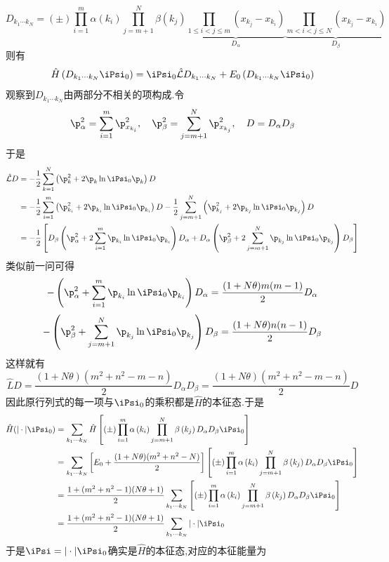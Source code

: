 \documentclass{ctexart}
\begin{document}
\begin{solution}
\begin{enumerate}[label=\tbf{(\alph*)}]
    \[D_{k_1\cdots k_N}=(\pm)\prod_{i=1}^{m}\alpha\left(k_i\right)\prod_{j=m+1}^{N}\beta\left(k_j\right)\underbrace{\prod_{1\leq i<j\leq m}\left(x_{k_j}-x_{k_i}\right)}_{D_\alpha}\underbrace{\prod_{m<i<j\leq N}\left(x_{k_j}-x_{k_i}\right)}_{D_\beta}\]
    则有
    \[\hat{H}\left(D_{k_1\cdots k_N}\iPsi_0\right)=\iPsi_0\hat{\mathcal{L}}D_{k_1\cdots k_N}+E_0\left(D_{k_1\cdots k_N}\iPsi_0\right)\]
    观察到$D_{k_1\cdots k_N}$由两部分不相关的项构成.令
    \[\p_\alpha^2=\sum_{i=1}^{m}\p^2_{x_{k_i}},\quad\p_\beta^2=\sum_{j=m+1}^{N}\p^2_{x_{k_j}},\quad D=D_\alpha D_\beta\]
    于是
    \[\begin{aligned}
        \hat{\mathcal{L}}D
        &=-\dfrac12\sum_{k=1}^{N}\left(\p_k^2+2\p_k\ln\iPsi_0\p_k\right)D\\
        &=-\dfrac12\sum_{i=1}^{m}\left(\p_{k_i}^2+2\p_{k_i}\ln\iPsi_0\p_{k_i}\right)D-\dfrac12\sum_{j=m+1}^{N}\left(\p_{k_j}^2+2\p_{k_j}\ln\iPsi_0\p_{k_j}\right)D\\
        &=-\dfrac12\left[D_\beta\left(\p_\alpha^2+2\sum_{i=1}^{m}\p_{k_i}\ln\iPsi_0\p_{k_i}\right)D_\alpha+D_\alpha\left(\p_\beta^2+2\sum_{j=m+1}^{N}\p_{k_j}\ln\iPsi_0\p_{k_j}\right)D_\beta\right]
    \end{aligned}\]
    类似前一问可得
    \[-\left(\p_\alpha^2+\sum_{i=1}^{m}\p_{k_i}\ln\iPsi_0\p_{k_i}\right)D_\alpha=\dfrac{(1+N\theta)m(m-1)}{2}D_\alpha\]
    \[-\left(\p_\beta^2+\sum_{j=m+1}^{N}\p_{k_j}\ln\iPsi_0\p_{k_j}\right)D_\beta=\dfrac{(1+N\theta)n(n-1)}{2}D_\beta\]
    这样就有
    \[\hat{L}D=\dfrac{(1+N\theta)(m^2+n^2-m-n)}{2}D_\alpha D_\beta=\dfrac{(1+N\theta)(m^2+n^2-m-n)}{2}D\]
    因此原行列式的每一项与$\iPsi_0$的乘积都是$\hat{H}$的本征态.于是
    \[\begin{aligned}
        \hat{H}(|\cdot|\iPsi_0)
        &=\sum_{k_1\cdots k_N}\hat{H}\left[(\pm)\prod_{i=1}^{m}\alpha\left(k_i\right)\prod_{j=m+1}^{N}\beta\left(k_j\right)D_\alpha D_\beta\iPsi_0\right]\\
        &=\sum_{k_1\cdots k_N}\left[E_0+\dfrac{(1+N\theta)(m^2+n^2-N)}{2}\right]\left[(\pm)\prod_{i=1}^{m}\alpha\left(k_i\right)\prod_{j=m+1}^{N}\beta\left(k_j\right)D_\alpha D_\beta\iPsi_0\right]\\
        &=\dfrac{1+(m^2+n^2-1)(N\theta+1)}{2}\sum_{k_1\cdots k_N}\left[(\pm)\prod_{i=1}^{m}\alpha\left(k_i\right)\prod_{j=m+1}^{N}\beta\left(k_j\right)D_\alpha D_\beta\iPsi_0\right]\\
        &=\dfrac{1+(m^2+n^2-1)(N\theta+1)}{2}\sum_{k_1\cdots k_N}|\cdot|\iPsi_0
    \end{aligned}\]
    于是$\iPsi=|\cdot|\iPsi_0$确实是$\hat{H}$的本征态,对应的本征能量为

\end{enumerate}
\end{solution}
\end{document}
